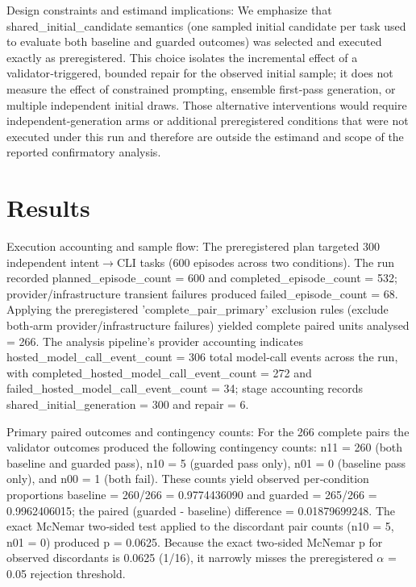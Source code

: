\documentclass[conference]{IEEEtran}
\begin{document}
Design constraints and estimand implications: We emphasize that shared\_initial\_candidate semantics (one sampled initial candidate per task used to evaluate both baseline and guarded outcomes) was selected and executed exactly as preregistered. This choice isolates the incremental effect of a validator‑triggered, bounded repair for the observed initial sample; it does not measure the effect of constrained prompting, ensemble first‑pass generation, or multiple independent initial draws. Those alternative interventions would require independent-generation arms or additional preregistered conditions that were not executed under this run and therefore are outside the estimand and scope of the reported confirmatory analysis.

\section{Results}
Execution accounting and sample flow: The preregistered plan targeted 300 independent intent\ensuremath{\rightarrow}CLI tasks (600 episodes across two conditions). The run recorded planned\_episode\_count = 600 and completed\_episode\_count = 532; provider/infrastructure transient failures produced failed\_episode\_count = 68. Applying the preregistered 'complete\_pair\_primary' exclusion rules (exclude both‑arm provider/infrastructure failures) yielded complete paired units analysed = 266. The analysis pipeline's provider accounting indicates hosted\_model\_call\_event\_count = 306 total model‑call events across the run, with completed\_hosted\_model\_call\_event\_count = 272 and failed\_hosted\_model\_call\_event\_count = 34; stage accounting records shared\_initial\_generation = 300 and repair = 6.

Primary paired outcomes and contingency counts: For the 266 complete pairs the validator outcomes produced the following contingency counts: n11 = 260 (both baseline and guarded pass), n10 = 5 (guarded pass only), n01 = 0 (baseline pass only), and n00 = 1 (both fail). These counts yield observed per‑condition proportions baseline = 260/266 = 0.9774436090 and guarded = 265/266 = 0.9962406015; the paired (guarded - baseline) difference = 0.01879699248. The exact McNemar two‑sided test applied to the discordant pair counts (n10 = 5, n01 = 0) produced p = 0.0625. Because the exact two‑sided McNemar p for observed discordants is 0.0625 (1/16), it narrowly misses the preregistered \ensuremath{\alpha} = 0.05 rejection threshold.
\end{document}
